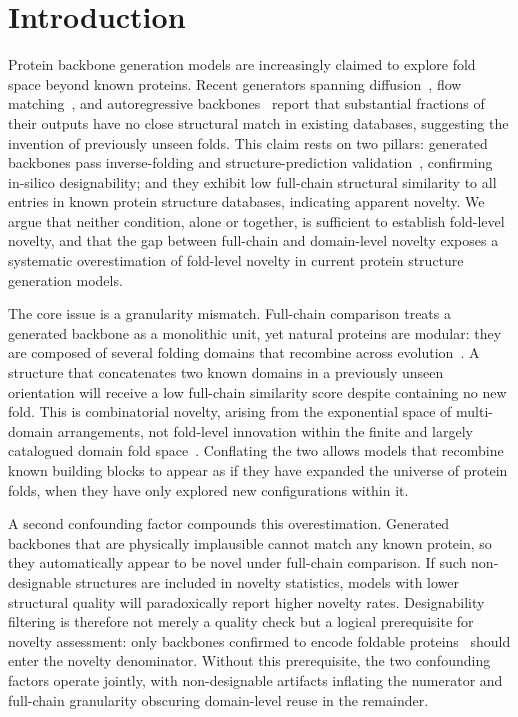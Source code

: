 \documentclass[letterpaper]{article} %
\begin{document}
\section{Introduction}

Protein backbone generation models are increasingly claimed to explore fold space beyond known proteins. Recent generators spanning diffusion~\cite{watson2023novo,yim2023se}, flow matching~\cite{yim2023fast,campbell2024generative}, and autoregressive backbones~\cite{ingraham2023illuminating} report that substantial fractions of their outputs have no close structural match in existing databases, suggesting the invention of previously unseen folds. This claim rests on two pillars: generated backbones pass inverse-folding and structure-prediction validation~\cite{dauparas2022robust,abramson2024accurate}, confirming in-silico designability; and they exhibit low full-chain structural similarity to all entries in known protein structure databases, indicating apparent novelty. We argue that neither condition, alone or together, is sufficient to establish fold-level novelty, and that the gap between full-chain and domain-level novelty exposes a systematic overestimation of fold-level novelty in current protein structure generation models.

The core issue is a granularity mismatch. Full-chain comparison treats a generated backbone as a monolithic unit, yet natural proteins are modular: they are composed of several folding domains that recombine across evolution~\cite{chothia1992one,orengo1997cath}. A structure that concatenates two known domains in a previously unseen orientation will receive a low full-chain similarity score despite containing no new fold. This is combinatorial novelty, arising from the exponential space of multi-domain arrangements, not fold-level innovation within the finite and largely catalogued domain fold space~\cite{wolf2000estimating,levitt2009nature}. Conflating the two allows models that recombine known building blocks to appear as if they have expanded the universe of protein folds, when they have only explored new configurations within it.

A second confounding factor compounds this overestimation. Generated backbones that are physically implausible cannot match any known protein, so they automatically appear to be novel under full-chain comparison. If such non-designable structures are included in novelty statistics, models with lower structural quality will paradoxically report higher novelty rates. Designability filtering is therefore not merely a quality check but a logical prerequisite for novelty assessment: only backbones confirmed to encode foldable proteins~\cite{dauparas2022robust, abramson2024accurate} should enter the novelty denominator. Without this prerequisite, the two confounding factors operate jointly, with non-designable artifacts inflating the numerator and full-chain granularity obscuring domain-level reuse in the remainder.
\end{document}
